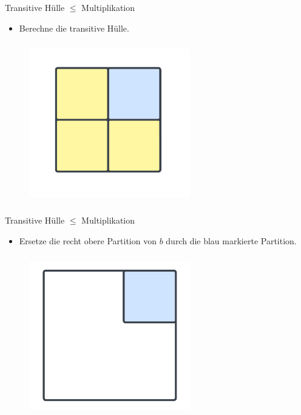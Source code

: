 \documentclass{beamer}
\begin{document}
	\begin{frame}{Transitive Hülle $\le$ Multiplikation}
		\begin{itemize}
			\item Berechne die transitive Hülle.
		\end{itemize} 
		\begin{figure}
			\centering
			\includegraphics[width=7cm,height=7cm]{img/LGV8}
		\end{figure}
	\end{frame}

	\begin{frame}{Transitive Hülle $\le$ Multiplikation}
		\begin{itemize}
			\item Ersetze die recht obere Partition von $b$ durch die blau markierte Partition. 
		\end{itemize} 
		\begin{figure}
			\centering
			\includegraphics[width=7cm,height=7cm]{img/LGV9}
		\end{figure}
	\end{frame}
\end{document}
